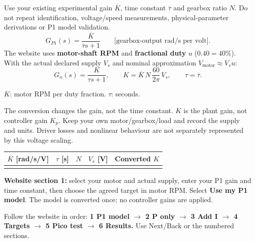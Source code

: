 \documentclass[10pt,a4paper]{article}
\newcommand{\note}[1]{\par\vspace{4pt}\begingroup\setlength{\fboxsep}{8pt}\colorbox{soft}{\parbox{\dimexpr\linewidth-16pt\relax}{#1}}\endgroup\par\vspace{4pt}}
\newcommand{\ui}[1]{\textbf{#1}}
\begin{document}
Use your existing experimental gain $\overline K$, time constant $\overline\tau$ and gearbox ratio $N$. Do not repeat identification, voltage/speed measurements, physical-parameter derivations or P1 model validation.
\[
G_{P1}(s)=\frac{\overline K}{\overline\tau s+1}
\qquad\text{[gearbox-output rad/s per volt].}
\]
The website uses \textbf{motor-shaft RPM} and \textbf{fractional duty} $u$ ($0.40=40\%$). With the actual declared supply $V_s$ and nominal approximation $V_{\mathrm{motor}}\approx V_su$:
\[
G_n(s)=\frac{K}{\tau s+1},\qquad
K=\overline K\,N\,\frac{60}{2\pi}\,V_s,\qquad
\tau=\overline\tau.
\]
\begin{center}\small $K$: motor RPM per duty fraction. $\tau$: seconds.\end{center}
The conversion changes the gain, not the time constant. $K$ is the plant gain, not controller gain $K_p$. Keep your own motor/gearbox/load and record the supply and units. Driver losses and nonlinear behaviour are not separately represented by this voltage scaling.
\vspace{4pt}
\begin{tabularx}{\linewidth}{@{}Y Y Y Y Y@{}}
\toprule
{}\textbf{$\overline K$ [rad/s/V]}&\textbf{$\tau$ [s]}&\textbf{$N$}&\textbf{$V_s$ [V]}&\textbf{Converted $K$}\\
\midrule
\rule{0pt}{26pt}&&&&\\\bottomrule
\end{tabularx}
\note{\textbf{Website section 1:} select your motor and actual supply, enter your P1 gain and time constant, then choose the agreed target in motor RPM. Select \ui{Use my P1 model}. The model is converted once; no controller gains are applied.}
Follow the website in order: \textbf{1 P1 model $\to$ 2 P only $\to$ 3 Add I $\to$ 4 Targets $\to$ 5 Pico test $\to$ 6 Results.} Use Next/Back or the numbered sections.
\end{document}
